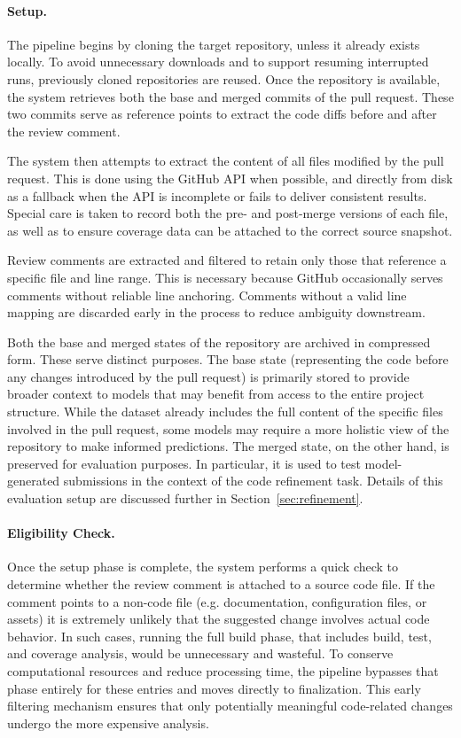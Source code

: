 \paragraph{Setup.} The pipeline begins by cloning the target repository, unless it already exists
locally. To avoid unnecessary downloads and to support resuming interrupted runs, previously cloned
repositories are reused. Once the repository is available, the system retrieves both the base and
merged commits of the pull request. These two commits serve as reference points to extract the code
diffs before and after the review comment.

The system then attempts to extract the content of all files modified by the pull request. This is
done using the GitHub API when possible, and directly from disk as a fallback when the API is
incomplete or fails to deliver consistent results. Special care is taken to record both the pre- and
post-merge versions of each file, as well as to ensure coverage data can be attached to the correct
source snapshot.

Review comments are extracted and filtered to retain only those that reference a specific file and
line range. This is necessary because GitHub occasionally serves comments without reliable line
anchoring. Comments without a valid line mapping are discarded early
in the process to reduce ambiguity downstream.

Both the base and merged states of the repository are archived in compressed form. These serve
distinct purposes. The base state (representing the code before any changes introduced by the pull
request) is primarily stored to provide broader context to models that may benefit from
access to the entire project structure. While the dataset already includes the full content of the
specific files involved in the pull request, some models may require a more holistic view of the
repository to make informed predictions. The merged state, on the other hand, is preserved for
evaluation purposes. In particular, it is used to test model-generated submissions in the context of
the code refinement task. Details of this evaluation setup are discussed further in
Section~\ref{sec:refinement}.

\paragraph{Eligibility Check.} Once the setup phase is complete, the system performs a quick check
to determine whether the review comment is attached to a source code file. If the comment points to
a non-code file (e.g. documentation, configuration files, or assets) it is extremely unlikely that
the suggested change involves actual code behavior. In such cases, running the full build phase,
that includes build, test, and coverage analysis, would be unnecessary and wasteful. To conserve
computational resources and reduce processing time, the pipeline bypasses that phase entirely for
these entries and moves directly to finalization. This early filtering mechanism ensures that only
potentially meaningful code-related changes undergo the more expensive analysis.

